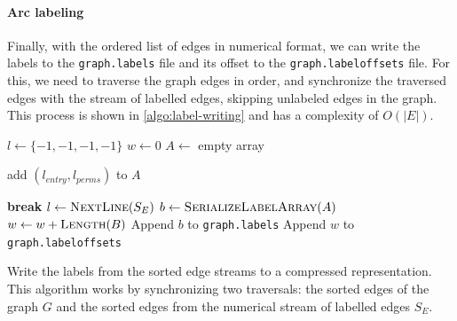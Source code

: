 \paragraph{Arc labeling}
Finally, with the ordered list of edges in numerical format, we can write the
labels to the \texttt{graph.labels} file and its offset to the
\texttt{graph.labeloffsets} file. For this, we need to traverse the graph edges
in order, and synchronize the traversed edges with the stream of labelled
edges, skipping unlabeled edges in the graph. This process is shown in
\cref{algo:label-writing} and has a complexity of $O(|E|)$.

\begin{algorithm}[htb]
    \begin{algorithmic}
        \State $l \gets \{-1, -1, -1, -1\}$ 
         
            \State $w \gets 0$ 
             
                \State $A \gets$ empty array 
                 

                     
                        \State add $(l_\mathit{entry}, l_\mathit{perms})$ to $A$
                    \EndIf

                     
                        \State \textbf{break}
                    \Else
                        \State $l \gets \Call{NextLine}{S_E}$
                    \EndIf
                \EndWhile
                \State $b \gets \Call{SerializeLabelArray}{A}$
                \State $w \gets w + \Call{Length}{B}$
                \State Append $b$ to \texttt{graph.labels}
            \EndFor
            \State Append $w$ to \texttt{graph.labeloffsets}
        \EndFor
        \EndFunction
    \end{algorithmic}

    \caption{Write the labels from the sorted edge streams to a compressed
    representation. This algorithm works by synchronizing two traversals: the
sorted edges of the graph $G$ and the sorted edges from the numerical stream of
labelled edges $S_E$.}%
    \label{algo:label-writing}
\end{algorithm}

